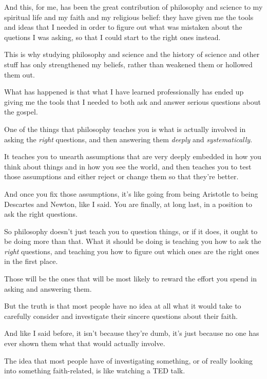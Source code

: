 \begin{compactitem}
			\item And this, for me, has been the great contribution of philosophy and science to my spiritual life and my faith and my religious belief: they have given me the tools and ideas that I needed in order to figure out what was mistaken about the quetions I was asking, so that I could start to the right ones instead.
				\begin{compactitem}
					\item This is why studying philosophy and science and the history of science and other stuff has only strengthened my beliefs, rather than weakened them or hollowed them out.
					\item What has happened is that what I have learned professionally has ended up giving me the tools that I needed to both ask and answer serious questions about the gospel.
					\item One of the things that philosophy teaches you is what is actually involved in asking the \textit{right} questions, and then answering them \textit{deeply} and \textit{systematically}.
					\item It teaches you to unearth assumptions that are very deeply embedded in how you think about things and in how you see the world, and then teaches you to test those assumptions and either reject or change them so that they're better.
					\item And once you fix those assumptions, it's like going from being Aristotle to being Descartes and Newton, like I said. You are finally, at long last, in a position to ask the right questions.
					\item So philosophy doesn't just teach you to question things, or if it does, it ought to be doing more than that. What it should be doing is teaching you how to ask the \textit{right} questions, and teaching you how to figure out which ones are the right ones in the first place.
					\item Those will be the ones that will be most likely to reward the effort you spend in asking and answering them.
					\item But the truth is that most people have no idea at all what it would take to carefully consider and investigate their sincere questions about their faith.
					\item And like I said before, it isn't because they're dumb, it's just because no one has ever shown them what that would actually involve. 
					\item The idea that most people have of investigating something, or of really looking into something faith-related, is like watching a TED talk.

\end{compactitem}
\end{compactitem}
